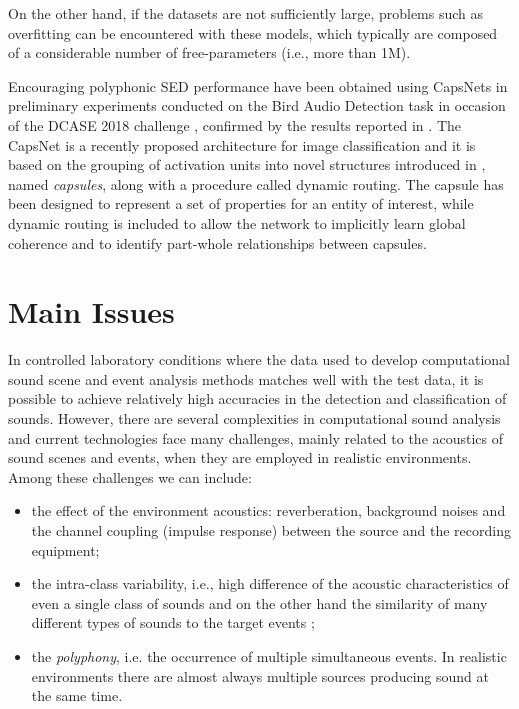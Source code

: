 On the other hand, if the datasets are not sufficiently large, problems such as overfitting can be encountered with these models, which typically are composed of a considerable number of free-parameters (i.e., more than 1M). 

Encouraging polyphonic SED performance have been obtained using CapsNets in preliminary experiments conducted on the Bird Audio Detection task in occasion of the DCASE 2018 challenge \cite{vesperini2018capsule}, confirmed by the results reported in \cite{iqbal2018capsule}.
The CapsNet \cite{sabour2017dynamic} is a recently proposed architecture for image classification and it is based on the grouping of activation units into novel structures introduced in \cite{hinton2011transforming}, named \textit{capsules}, along with a procedure called dynamic routing. The capsule has been designed to represent a set of properties for an entity of interest, while dynamic routing is included to allow the network to implicitly learn global coherence and to identify part-whole relationships between capsules.

\section{Main Issues}
In controlled laboratory conditions where the data used to develop computational sound scene and event analysis methods matches well with the test data, it is possible to achieve relatively high accuracies in the detection and classification of sounds.  However, there are several complexities in computational sound analysis and current technologies face many challenges, mainly related to the acoustics of sound scenes and events, when they are employed in realistic environments.
Among these challenges we can include:
\begin{itemize}
	\item the effect of the environment acoustics: reverberation, background noises and the channel coupling (impulse response) between the source and the recording equipment;
	\item the intra-class variability, i.e., high difference of the acoustic characteristics of even a single class of sounds and on the other hand the similarity of many different types of sounds to the target events  \cite{stowell2015acoustic};
	\item the \textit{polyphony}, i.e. the occurrence of multiple simultaneous events. In realistic environments there
	are almost always multiple sources producing sound at the same time. 
\end{itemize}

